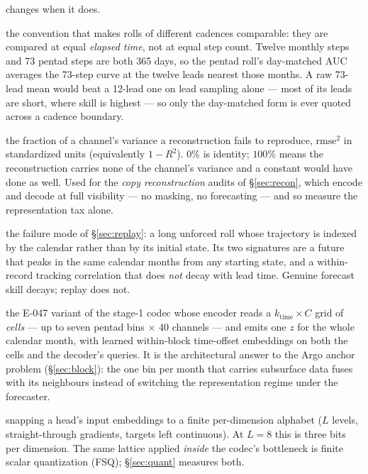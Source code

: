 \documentclass[10pt]{article}
\begin{document}
\begin{description}
  changes when it does.
\item[Day-matched horizon] the convention that makes rolls of different
  cadences comparable: they are compared at equal \emph{elapsed time}, not
  at equal step count. Twelve monthly steps and 73 pentad steps are both
  365 days, so the pentad roll's day-matched AUC averages the 73-step
  curve at the twelve leads nearest those months. A raw 73-lead mean would
  beat a 12-lead one on lead sampling alone --- most of its leads are
  short, where skill is highest --- so only the day-matched form is ever
  quoted across a cadence boundary.
\item[Variance lost / FVU] the fraction of a channel's variance a
  reconstruction fails to reproduce, $\mathrm{rmse}^2$ in standardized
  units (equivalently $1-R^2$). $0\%$ is identity; $100\%$ means the
  reconstruction carries none of the channel's variance and a constant
  would have done as well. Used for the \emph{copy reconstruction} audits
  of \S\ref{sec:recon}, which encode and decode at full visibility --- no
  masking, no forecasting --- and so measure the representation tax alone.
\item[Calendar replay] the failure mode of \S\ref{sec:replay}: a long
  unforced roll whose trajectory is indexed by the calendar rather than by
  its initial state. Its two signatures are a future that peaks in the
  same calendar months from any starting state, and a within-record
  tracking correlation that does \emph{not} decay with lead time. Genuine
  forecast skill decays; replay does not.
\item[Month-block codec] the E-047 variant of the stage-1 codec whose
  encoder reads a $k_{\mathrm{time}}\times C$ grid of \emph{cells} --- up
  to seven pentad bins $\times$ 40 channels --- and emits one $z$ for the
  whole calendar month, with learned within-block time-offset embeddings
  on both the cells and the decoder's queries. It is the architectural
  answer to the Argo anchor problem (\S\ref{sec:block}): the one bin per
  month that carries subsurface data fuses with its neighbours instead of
  switching the representation regime under the forecaster.
\item[Input quantization] snapping a head's input embeddings to a finite
  per-dimension alphabet ($L$ levels, straight-through gradients, targets
  left continuous). At $L=8$ this is three bits per dimension. The same
  lattice applied \emph{inside} the codec's bottleneck is finite scalar
  quantization (FSQ); \S\ref{sec:quant} measures both.
\end{description}
\end{document}
